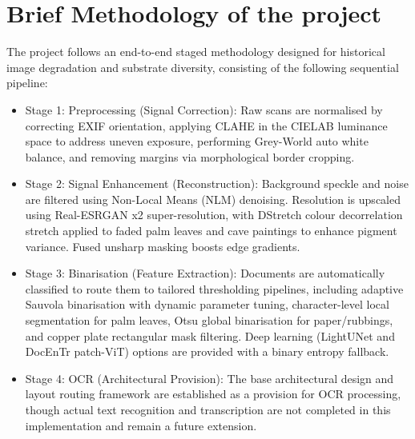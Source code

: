 \section[Brief Methodology of the project]{Brief Methodology of the project}
The project follows an end-to-end staged methodology designed for historical image degradation and substrate diversity, consisting of the following sequential pipeline:
\begin{itemize}
    \item Stage 1: Preprocessing (Signal Correction): Raw scans are normalised by correcting EXIF orientation, applying CLAHE in the CIELAB luminance space to address uneven exposure, performing Grey-World auto white balance, and removing margins via morphological border cropping.
    \item Stage 2: Signal Enhancement (Reconstruction): Background speckle and noise are filtered using Non-Local Means (NLM) denoising. Resolution is upscaled using Real-ESRGAN x2 super-resolution, with DStretch colour decorrelation stretch applied to faded palm leaves and cave paintings to enhance pigment variance. Fused unsharp masking boosts edge gradients.
    \item Stage 3: Binarisation (Feature Extraction): Documents are automatically classified to route them to tailored thresholding pipelines, including adaptive Sauvola binarisation with dynamic parameter tuning, character-level local segmentation for palm leaves, Otsu global binarisation for paper/rubbings, and copper plate rectangular mask filtering. Deep learning (LightUNet and DocEnTr patch-ViT) options are provided with a binary entropy fallback.
    \item Stage 4: OCR (Architectural Provision): The base architectural design and layout routing framework are established as a provision for OCR processing, though actual text recognition and transcription are not completed in this implementation and remain a future extension.
\end{itemize}

